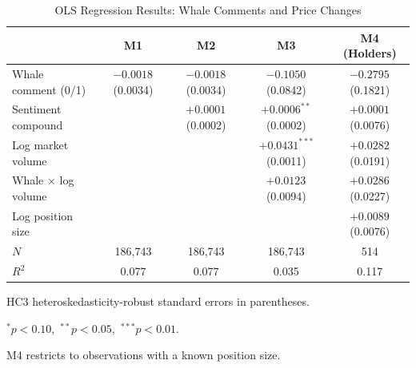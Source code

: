 \begin{table}[htbp]
  \centering
  \caption{OLS Regression Results: Whale Comments and Price Changes}
  \label{tab:regression}
  \begin{tabular}{lcccc}
    \toprule
    & M1 & M2 & M3 & M4 (Holders) \\
    \midrule
    Whale comment (0/1) & $-0.0018^{}$ (0.0034) & $-0.0018^{}$ (0.0034) & $-0.1050^{}$ (0.0842) & $-0.2795^{}$ (0.1821) \\
    Sentiment compound &  & $+0.0001^{}$ (0.0002) & $+0.0006^{**}$ (0.0002) & $+0.0001^{}$ (0.0076) \\
    Log market volume &  &  & $+0.0431^{***}$ (0.0011) & $+0.0282^{}$ (0.0191) \\
    Whale $\times$ log volume &  &  & $+0.0123^{}$ (0.0094) & $+0.0286^{}$ (0.0227) \\
    Log position size &  &  &  & $+0.0089^{}$ (0.0076) \\
    \midrule
    $N$ & 186,743 & 186,743 & 186,743 & 514 \\
    $R^2$ & 0.077 & 0.077 & 0.035 & 0.117 \\
    \bottomrule
  \end{tabular}
  \begin{tablenotes}\small
    \item HC3 heteroskedasticity-robust standard errors in parentheses.
    \item $^{*}p<0.10$,\ $^{**}p<0.05$,\ $^{***}p<0.01$.
    \item M4 restricts to observations with a known position size.
  \end{tablenotes}
\end{table}
